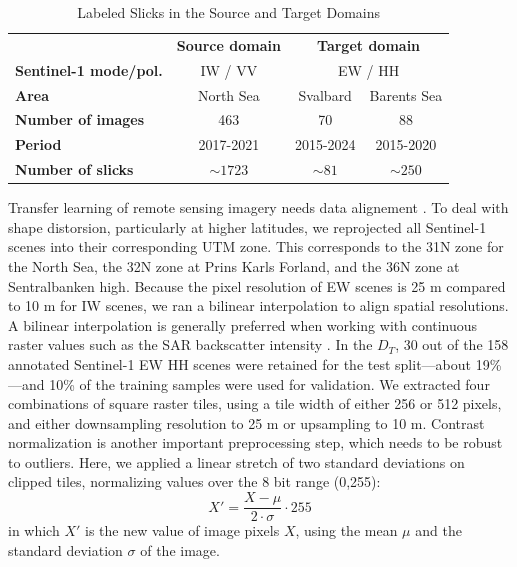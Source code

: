 \documentclass[journal]{IEEEtran}
\begin{document}
\begin{table}[!t]
    \caption{Labeled Slicks in the Source and Target Domains}
    \label{table1}
    \centering
    \begin{tabular}{lcc|cc}
        \toprule
        & \multicolumn{2}{c}{\textbf{Source domain}} & \multicolumn{2}{c}{\textbf{Target domain}} \\
        \cmidrule(lr){2-3} \cmidrule(lr){4-5}
        \textbf{Sentinel-1 mode/pol.} & \multicolumn{2}{c}{IW / VV} & \multicolumn{2}{c}{EW / HH} \\
        \midrule
        \textbf{Area} & \multicolumn{2}{c}{North Sea} & Svalbard & Barents Sea \\
        \textbf{Number of images} & \multicolumn{2}{c}{463} & 70 & 88 \\
        \textbf{Period} & \multicolumn{2}{c}{2017-2021} & 2015-2024 & 2015-2020 \\
        \textbf{Number of slicks} & \multicolumn{2}{c}{$\sim 1723$} & $\sim 81$ & $\sim 250$ \\
        \bottomrule
    \end{tabular}
\end{table}

Transfer learning of remote sensing imagery needs data alignement \cite{tuiaDomainAdaptationClassification2016}. To deal with shape distorsion, particularly at higher latitudes, we reprojected 
all Sentinel-1 scenes into their corresponding UTM zone. This corresponds to the 31N zone for the North Sea, the 32N zone at Prins Karls Forland, and the 36N zone at Sentralbanken high. 
Because the pixel resolution of EW scenes is 25 m compared to 10 m for IW scenes, we ran a bilinear interpolation to align spatial resolutions. A bilinear interpolation is 
generally preferred when working with continuous raster values such as the SAR backscatter intensity \cite{schowengerdtRemoteSensingModels2006}. In the $\mathit{D}_T$, 30 out of the 158 annotated Sentinel-1 EW HH scenes were retained for the test 
split—about 19\%—and 10\% of the training samples were used for validation. We extracted four combinations of square raster tiles, using a tile width of either 256 or 512 pixels, and either downsampling 
resolution to 25 m or upsampling to 10 m. Contrast normalization is another important preprocessing step, which needs to be robust to outliers\cite{goodfellowDeepLearning2016,schowengerdtRemoteSensingModels2006}. 
Here, we applied a linear stretch of two standard deviations on clipped tiles, normalizing values over the 8 bit range (0,255):
\begin{equation}
    X' = \frac{X - \mu }{2 \cdot \sigma} \cdot 255
\end{equation}
in which \( X' \) is the new value of image pixels \( X \), using the mean \( \mu \) and the standard deviation \( \sigma \) of the image.
\end{document}
